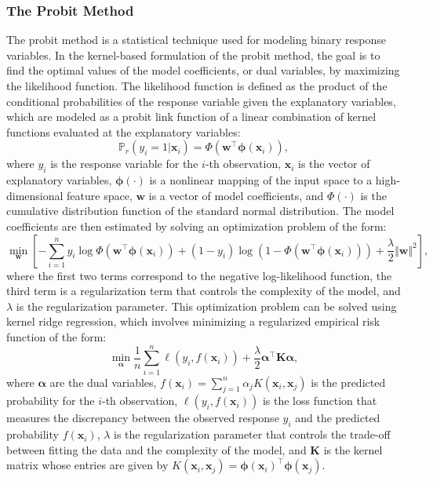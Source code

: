 \documentclass[12pt]{amsart}
\begin{document}
\subsubsection{The Probit Method}
The probit method is a statistical technique used for modeling binary response variables. In the kernel-based formulation of the probit method, the goal is to find the optimal values of the model coefficients, or dual variables, by maximizing the likelihood function. The likelihood function is defined as the product of the conditional probabilities of the response variable given the explanatory variables, which are modeled as a probit link function of a linear combination of kernel functions evaluated at the explanatory variables:
$$\mathbb{P}_r(y_i = 1 | \mathbf{x}_i) = \Phi(\mathbf{w}^\top \boldsymbol{\phi}(\mathbf{x}_i)),$$
where $y_i$ is the response variable for the $i$-th observation, $\mathbf{x}_i$ is the vector of explanatory variables, $\boldsymbol{\phi}(\cdot)$ is a nonlinear mapping of the input space to a high-dimensional feature space, $\mathbf{w}$ is a vector of model coefficients, and $\Phi(\cdot)$ is the cumulative distribution function of the standard normal distribution. The model coefficients are then estimated by solving an optimization problem of the form:
$$\min_{\mathbf{w}} \left[- \sum_{i=1}^n y_i \log \Phi(\mathbf{w}^\top \boldsymbol{\phi}(\mathbf{x}_i)) + (1 - y_i) \log (1 - \Phi(\mathbf{w}^\top \boldsymbol{\phi}(\mathbf{x}_i))) + \frac{\lambda}{2} \Vert \mathbf{w} \Vert^2\right],$$
where the first two terms correspond to the negative log-likelihood function, the third term is a regularization term that controls the complexity of the model, and $\lambda$ is the regularization parameter. This optimization problem can be solved using kernel ridge regression, which involves minimizing a regularized empirical risk function of the form:
$$\min_{\boldsymbol{\alpha}} \frac{1}{n} \sum_{i=1}^n \ell(y_i, f(\mathbf{x}_i)) + \frac{\lambda}{2} \boldsymbol{\alpha}^\top \mathbf{K} \boldsymbol{\alpha},$$
where $\boldsymbol{\alpha}$ are the dual variables, $f(\mathbf{x}_i) = \sum_{j=1}^n \alpha_j K(\mathbf{x}_i, \mathbf{x}_j)$ is the predicted probability for the $i$-th observation, $\ell(y_i, f(\mathbf{x}_i))$ is the loss function that measures the discrepancy between the observed response $y_i$ and the predicted probability $f(\mathbf{x}_i)$, $\lambda$ is the regularization parameter that controls the trade-off between fitting the data and the complexity of the model, and $\mathbf{K}$ is the kernel matrix whose entries are given by $K(\mathbf{x}_i, \mathbf{x}_j) = \boldsymbol{\phi}(\mathbf{x}_i)^\top \boldsymbol{\phi}(\mathbf{x}_j)$. 
\end{document}
